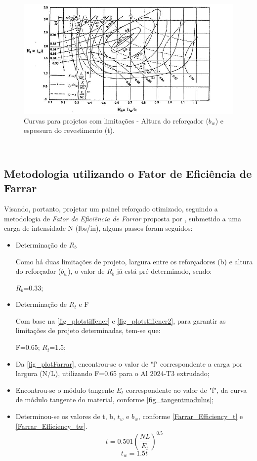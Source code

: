 {\begin{figure}[ht]
	\caption{\label{fig_plotstiffener2}Curvas para projetos com limitações - Altura do reforçador ($b_w$) e espessura do revestimento (t).}
  \centering
  \includegraphics[scale=0.8]{figura/PlotStiffener2}
\end{figure}
\

\subsection{Metodologia utilizando o Fator de Eficiência de Farrar}

Visando, portanto, projetar um painel reforçado otimizado, seguindo a metodologia de \emph{Fator de Eficiência de Farrar} proposta por \cite{niu1997airframe}, submetido a uma carga de intensidade N (lbs/in), alguns passos foram seguidos:

\begin{itemize}
\item Determinação de $R_b$ \

Como há duas limitações de projeto, largura entre os reforçadores (b) e altura do reforçador ($b_w$), o valor de $R_b$ já está pré-determinado, sendo:

$R_b$=0.33;\
\item Determinação de $R_t$ e F\

Com base na \autoref{fig_plotstiffener} e \autoref{fig_plotstiffener2}, para garantir as limitações de projeto determinadas, tem-se que:

F=0.65; $R_t$=1.5;

\item Da \autoref{fig_plotFarrar}, encontrou-se o valor de "f" correspondente a carga por largura (N/L), utilizando F=0.65 para o Al 2024-T3 extrudado;
\item Encontrou-se o módulo tangente $E_t$ correspondente ao valor de "f", da curva de módulo tangente do material, conforme \autoref{fig_tangentmodulus};
\item Determinou-se os valores de t, b, $t_w$ e $b_w$, conforme \autoref{Farrar_Efficiency_t} e \autoref{Farrar_Efficiency_tw}.
\begin{equation} \label{Farrar_Efficiency_t}
t = 0.501({\dfrac{NL}{E_t}})^{0.5}
\end{equation}
\begin{equation} \label{Farrar_Efficiency_tw}
t_w = 1.5t
\end{equation}


\end{itemize}}
